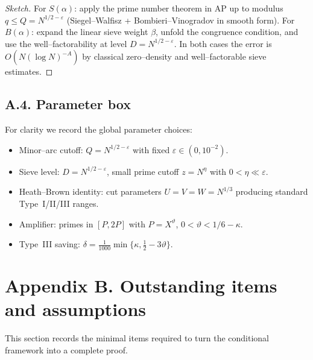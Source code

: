 \documentclass[11pt]{article}
\theoremstyle{definition}
\theoremstyle{remark}
\begin{document}
\begin{proof}[Sketch]
For $S(\alpha)$: apply the prime number theorem in AP up to modulus $q\le Q=N^{1/2-\varepsilon}$ (Siegel--Walfisz + Bombieri--Vinogradov in smooth form).  
For $B(\alpha)$: expand the linear sieve weight $\beta$, unfold the congruence condition, and use the well--factorability at level $D=N^{1/2-\varepsilon}$. In both cases the error is $O(N(\log N)^{-A})$ by classical zero--density and well--factorable sieve estimates.
\end{proof}

\subsection*{A.4. Parameter box}

For clarity we record the global parameter choices:
\begin{itemize}
\item Minor--arc cutoff: $Q=N^{1/2-\varepsilon}$ with fixed $\varepsilon\in(0,10^{-2})$.
\item Sieve level: $D=N^{1/2-\varepsilon}$, small prime cutoff $z=N^\eta$ with $0<\eta\ll\varepsilon$.
\item Heath--Brown identity: cut parameters $U=V=W=N^{1/3}$ producing standard Type~I/II/III ranges.
\item Amplifier: primes in $[P,2P]$ with $P=X^\vartheta$, $0<\vartheta<1/6-\kappa$.
\item Type~III saving: $\delta=\tfrac{1}{1000}\min\{\kappa,\tfrac12-3\vartheta\}$.
\end{itemize}
\bigskip

\appendix
\section*{Appendix B. Outstanding items and assumptions}

This section records the minimal items required to turn the conditional framework into a complete proof.
\end{document}
